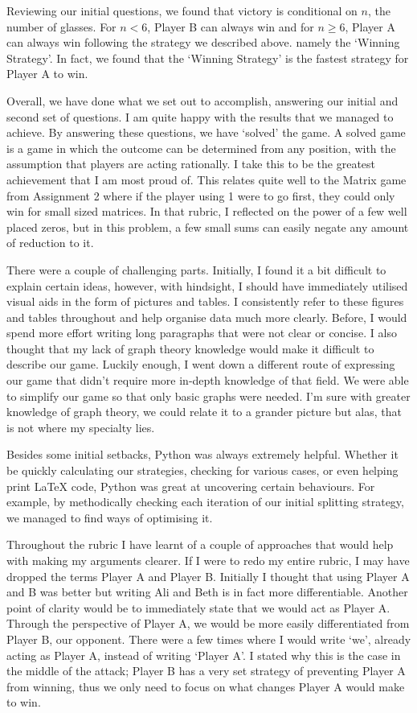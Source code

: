\documentclass[11pt]{article}
\newcommand{\keywordfont}{\textsc}
\newcommand{\keyword}[1]{%
  \marginpar{\raggedright\small\keywordfont{#1}}}
\begin{document}
Reviewing our initial questions, \keyword{Check} we found that victory is conditional on $n$, the number of glasses. For $n < 6$, Player B can always win and for $n \geq 6$, Player A can always win following the strategy we described above. namely the `Winning Strategy'. In fact, we found that the `Winning Strategy' is the fastest strategy for Player A to win. 

Overall, \keyword{Reflect} we have done what we set out to accomplish, answering our initial and second set of questions. I am quite happy with the results that we managed to achieve. By answering these questions, we have `solved' the game. A solved game is a game in which the outcome can be determined from any position, with the assumption that players are acting rationally. I take this to be the greatest achievement that I am most proud of. This relates quite well to the Matrix game from Assignment 2 where if the player using 1 were to go first, they could only win for small sized matrices. In that rubric, I reflected on the power of a few well placed zeros, but in this problem, a few small sums can easily negate any amount of reduction to it.

There \keyword{Reflect} were a couple of challenging parts. Initially, I found it a bit difficult to explain certain ideas, however, with hindsight, I should have immediately utilised visual aids in the form of pictures and tables. I consistently refer to these figures and tables throughout and help organise data much more clearly. Before, I would spend more effort writing long paragraphs that were not clear or concise. I also thought that my lack of graph theory knowledge would make it difficult to describe our game. Luckily enough, I went down a different route of expressing our game that didn't require more in-depth knowledge of that field. We were able to simplify our game so that only basic graphs were needed. I'm sure with greater knowledge of graph theory, we could relate it to a grander picture but alas, that is not where my specialty lies.

Besides \keyword{Reflect} some initial setbacks, Python was always extremely helpful. Whether it be quickly calculating our strategies, checking for various cases, or even helping print LaTeX code, Python was great at uncovering certain behaviours. For example, by methodically checking each iteration of our initial splitting strategy, we managed to find ways of optimising it. 

Throughout the \keyword{Reflect} rubric I have learnt of a couple of approaches that would help with making my arguments clearer. If I were to redo my entire rubric, I may have dropped the terms Player A and Player B. Initially I thought that using Player A and B was better but writing Ali and Beth is in fact more differentiable. Another point of clarity would be to immediately state that we would act as Player A. Through the perspective of Player A, we would be more easily differentiated from Player B, our opponent. There were a few times where I would write `we', already acting as Player A, instead of writing `Player A'. I stated why this is the case in the middle of the attack; Player B has a very set strategy of preventing Player A from winning, thus we only need to focus on what changes Player A would make to win. 
\end{document}
